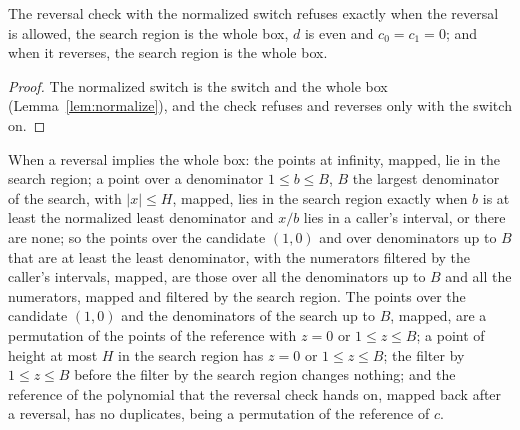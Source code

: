\begin{lemma}\label{lem:reversalRegion}
  \leanok
  The reversal check with the normalized switch refuses exactly when the reversal is allowed, the
  search region is the whole box, $d$ is even and $c_0 = c_1 = 0$; and when it reverses, the search
  region is the whole box.
\end{lemma}

\begin{proof}
  \leanok
  The normalized switch is the switch and the whole box (Lemma~\ref{lem:normalize}), and the check
  refuses and reverses only with the switch on.
\end{proof}

\begin{lemma}\label{lem:regionFilter}
  \leanok
  When a reversal implies the whole box: the points at infinity, mapped, lie in the search region; a
  point over a denominator $1 \le b \le B$, $B$ the largest denominator of the search, with
  $|x| \le H$, mapped, lies in the search region exactly when $b$ is at least the normalized least
  denominator and $x/b$ lies in a caller's interval, or there are none; so the points over the
  candidate $(1, 0)$ and over denominators up to $B$ that are at least the least denominator, with
  the numerators filtered by the caller's intervals, mapped, are those over all the denominators up
  to $B$ and all the numerators, mapped and filtered by the search region. The points over the
  candidate $(1, 0)$ and the denominators of the search up to $B$, mapped, are a permutation of the
  points of the reference with $z = 0$ or $1 \le z \le B$; a point of height at most $H$ in the
  search region has $z = 0$ or $1 \le z \le B$; the filter by $1 \le z \le B$ before the filter by
  the search region changes nothing; and the reference of the polynomial that the reversal check
  hands on, mapped back after a reversal, has no duplicates, being a permutation of the reference of
  $c$.
\end{lemma}

